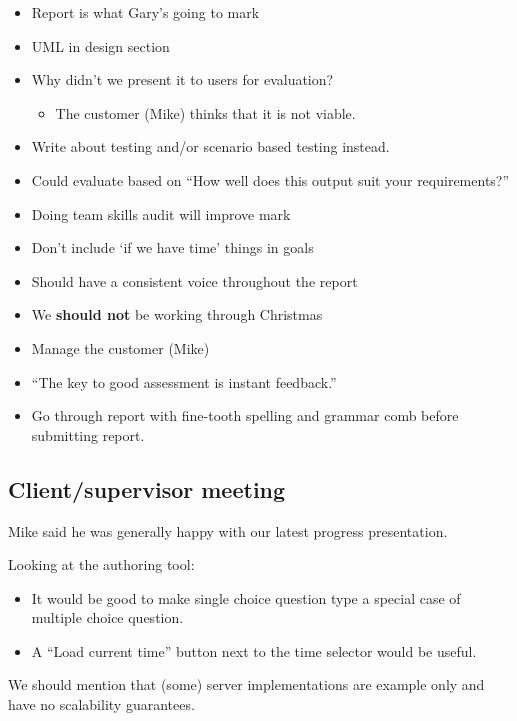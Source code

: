 \begin{itemize}
\item
  Report is what Gary's going to mark
\item
  UML in design section
\item
  Why didn't we present it to users for evaluation?

  \begin{itemize}
  \itemsep1pt\parskip0pt
  \item
    The customer (Mike) thinks that it is not viable.
  \end{itemize}
\item
  Write about testing and/or scenario based testing instead.
\item
  Could evaluate based on ``How well does this output suit your
  requirements?''
\item
  Doing team skills audit will improve mark
\item
  Don't include `if we have time' things in goals
\item
  Should have a consistent voice throughout the report
\item
  We \textbf{should not} be working through Christmas
\item
  Manage the customer (Mike)
\item
  ``The key to good assessment is instant feedback.''
\item
  Go through report with fine-tooth spelling and grammar comb before
  submitting report.
\end{itemize}

\subsection{Client/supervisor meeting}

Mike said he was generally happy with our latest progress presentation.

Looking at the authoring tool:

\begin{itemize}
\itemsep1pt\parskip0pt
\item
  It would be good to make single choice question type a special case of
  multiple choice question.
\item
  A ``Load current time'' button next to the time selector would be
  useful.
\end{itemize}

We should mention that (some) server implementations are example only
and have no scalability guarantees.

